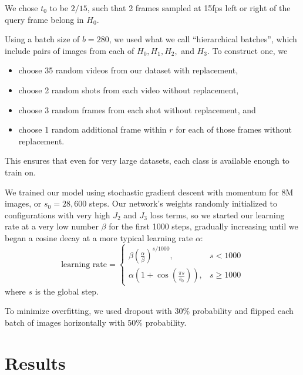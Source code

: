 \documentclass{article}
\begin{document}
\begin{multicols}{2}
We chose $t_0$ to be $2/15$, such that 2 frames sampled at 15fps left or right of the query frame belong in $H_0$.

Using a batch size of $b=280$, we used what we call ``hierarchical batches'', which include pairs of images from each of $H_0, H_1, H_2,$ and $H_3$.
To construct one, we
\begin{itemize}
\item choose 35 random videos from our dataset with replacement,
\item choose 2 random shots from each video without replacement,
\item choose 3 random frames from each shot without replacement, and
\item choose 1 random additional frame within $r$ for each of those frames without replacement.
\end{itemize}
This ensures that even for very large datasets, each class is available enough to train on.

We trained our model using stochastic gradient descent with momentum for 8M images, or $s_0 = 28,600$  steps. Our network's weights randomly initialized to configurations with very high $J_2$ and $J_3$ loss terms, so we started our learning rate at a very low number $\beta$ for the first 1000 steps, gradually increasing until we began a cosine decay at a more typical learning rate $\alpha$:
\[\text{learning rate} = \begin{cases}
\beta \left(\frac{\alpha}{\beta}\right)^{s / 1000}, & s < 1000 \\
\alpha\left(1 + \cos\left(\frac{\pi s}{s_0}\right)\right), & s \ge 1000
\end{cases}\]
where $s$ is the global step.

To minimize overfitting, we used dropout with 30\% probability and flipped each batch of images horizontally with 50\% probability.


\section{Results}


\end{multicols}
\end{document}
